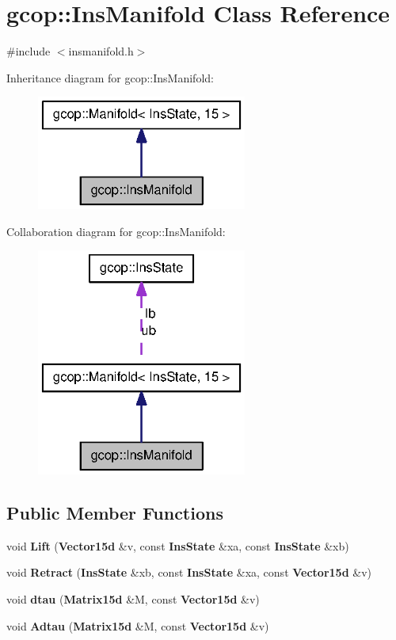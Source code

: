\section{gcop\-:\-:\-Ins\-Manifold \-Class \-Reference}
\label{classgcop_1_1InsManifold}


{\ttfamily \#include $<$insmanifold.\-h$>$}



\-Inheritance diagram for gcop\-:\-:\-Ins\-Manifold\-:
\nopagebreak
\begin{figure}[H]
\begin{center}
\leavevmode
\includegraphics[width=196pt]{classgcop_1_1InsManifold__inherit__graph}
\end{center}
\end{figure}


\-Collaboration diagram for gcop\-:\-:\-Ins\-Manifold\-:
\nopagebreak
\begin{figure}[H]
\begin{center}
\leavevmode
\includegraphics[width=196pt]{classgcop_1_1InsManifold__coll__graph}
\end{center}
\end{figure}
\subsection*{\-Public \-Member \-Functions}
\begin{DoxyCompactItemize}
\item 
void {\bf \-Lift} ({\bf \-Vector15d} \&v, const {\bf \-Ins\-State} \&xa, const {\bf \-Ins\-State} \&xb)
\item 
void {\bf \-Retract} ({\bf \-Ins\-State} \&xb, const {\bf \-Ins\-State} \&xa, const {\bf \-Vector15d} \&v)
\item 
void {\bf dtau} ({\bf \-Matrix15d} \&\-M, const {\bf \-Vector15d} \&v)
\item 
void {\bf \-Adtau} ({\bf \-Matrix15d} \&\-M, const {\bf \-Vector15d} \&v)
\end{DoxyCompactItemize}
